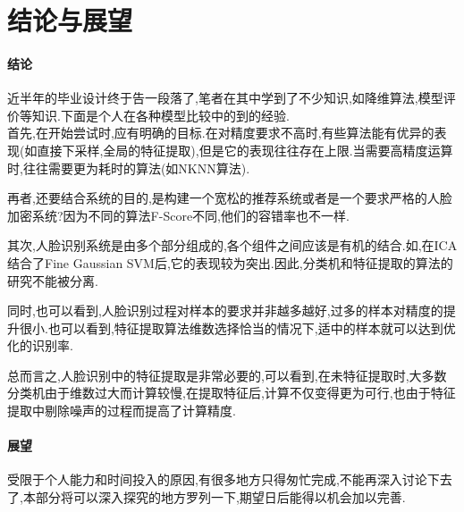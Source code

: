 \section{结论与展望}
\paragraph{结论}
近半年的毕业设计终于告一段落了,笔者在其中学到了不少知识,如降维算法,模型评价等知识.下面是个人在各种模型比较中的到的经验.\\


首先,在开始尝试时,应有明确的目标.在对精度要求不高时,有些算法能有优异的表现(如直接下采样,全局的特征提取),但是它的表现往往存在上限.当需要高精度运算时,往往需要更为耗时的算法(如NKNN算法).


再者,还要结合系统的目的,是构建一个宽松的推荐系统或者是一个要求严格的人脸加密系统?因为不同的算法F-Score不同,他们的容错率也不一样.


其次,人脸识别系统是由多个部分组成的,各个组件之间应该是有机的结合.如,在ICA结合了Fine Gaussian SVM后,它的表现较为突出.因此,分类机和特征提取的算法的研究不能被分离.


同时,也可以看到,人脸识别过程对样本的要求并非越多越好,过多的样本对精度的提升很小.也可以看到,特征提取算法维数选择恰当的情况下,适中的样本就可以达到优化的识别率.


总而言之,人脸识别中的特征提取是非常必要的,可以看到,在未特征提取时,大多数分类机由于维数过大而计算较慢,在提取特征后,计算不仅变得更为可行,也由于特征提取中剔除噪声的过程而提高了计算精度.



\paragraph{展望}
受限于个人能力和时间投入的原因,有很多地方只得匆忙完成,不能再深入讨论下去了,本部分将可以深入探究的地方罗列一下,期望日后能得以机会加以完善.

